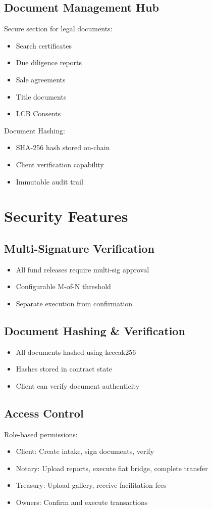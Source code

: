 \documentclass[12pt,a4paper]{article}
\begin{document}
\subsection{Document Management Hub}
Secure section for legal documents:
\begin{itemize}
\item Search certificates
\item Due diligence reports
\item Sale agreements
\item Title documents
\item LCB Consents
\end{itemize}

Document Hashing:
\begin{itemize}
\item SHA-256 hash stored on-chain
\item Client verification capability
\item Immutable audit trail
\end{itemize}

\section{Security Features}

\subsection{Multi-Signature Verification}
\begin{itemize}
\item All fund releases require multi-sig approval
\item Configurable M-of-N threshold
\item Separate execution from confirmation
\end{itemize}

\subsection{Document Hashing \& Verification}
\begin{itemize}
\item All documents hashed using keccak256
\item Hashes stored in contract state
\item Client can verify document authenticity
\end{itemize}

\subsection{Access Control}
Role-based permissions:
\begin{itemize}
\item Client: Create intake, sign documents, verify
\item Notary: Upload reports, execute fiat bridge, complete transfer
\item Treasury: Upload gallery, receive facilitation fees
\item Owners: Confirm and execute transactions
\end{itemize}
\end{document}
